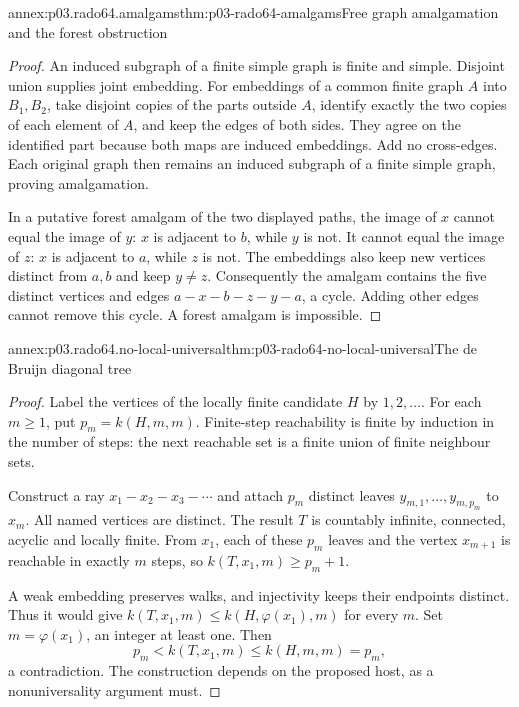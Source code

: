 \begin{annexitem}{annex:p03.rado64.amalgams}{thm:p03-rado64-amalgams}{Free graph amalgamation and the forest obstruction}
\begin{proof}
An induced subgraph of a finite simple graph is finite and simple.
Disjoint union supplies joint embedding. For embeddings of a common
finite graph \(A\) into \(B_1,B_2\), take disjoint copies of the parts
outside \(A\), identify exactly the two copies of each element of \(A\),
and keep the edges of both sides. They agree on the identified part because
both maps are induced embeddings. Add no cross-edges.
Each original graph then remains an induced subgraph of a finite simple
graph, proving amalgamation.

In a putative forest amalgam of the two displayed paths, the image of \(x\)
cannot equal the image of \(y\): \(x\) is adjacent to \(b\), while \(y\)
is not. It cannot equal the image of \(z\): \(x\) is adjacent to \(a\),
while \(z\) is not. The embeddings also keep new vertices distinct from
\(a,b\) and keep \(y\ne z\).
Consequently the amalgam contains the five distinct vertices and edges
\(a-x-b-z-y-a\), a cycle. Adding other edges cannot remove this cycle.
A forest amalgam is impossible.
\end{proof}
\end{annexitem}

\begin{annexitem}{annex:p03.rado64.no-local-universal}{thm:p03-rado64-no-local-universal}{The de Bruijn diagonal tree}
\begin{proof}
Label the vertices of the locally finite candidate \(H\) by
\(1,2,\ldots\). For each \(m\geq1\), put \(p_m=k(H,m,m)\).
Finite-step reachability is finite by induction in the number of steps:
the next reachable set is a finite union of finite neighbour sets.

Construct a ray \(x_1-x_2-x_3-\cdots\) and attach \(p_m\) distinct
leaves \(y_{m,1},\ldots,y_{m,p_m}\) to \(x_m\).
All named vertices are distinct. The result \(T\) is countably infinite,
connected, acyclic and locally finite. From \(x_1\), each of these
\(p_m\) leaves and the vertex \(x_{m+1}\) is reachable in exactly \(m\)
steps, so \(k(T,x_1,m)\geq p_m+1\).

A weak embedding preserves walks, and injectivity keeps their endpoints
distinct. Thus it would give
\(k(T,x_1,m)\leq k(H,\varphi(x_1),m)\) for every \(m\).
Set \(m=\varphi(x_1)\), an integer at least one. Then
\[
 p_m<k(T,x_1,m)\leq k(H,m,m)=p_m,
\]
a contradiction. The construction depends on the proposed host, as a
nonuniversality argument must.
\end{proof}
\end{annexitem}


